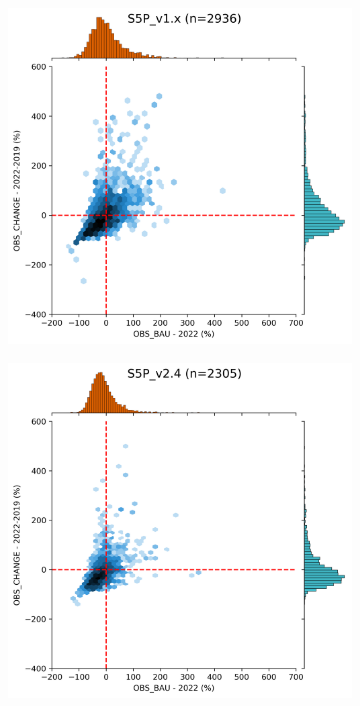 \begin{figure}[p]
    \centering
    \begin{subfigure}{.5\textwidth}
      \centering
      \includegraphics[width=\textwidth]{figs/chap3/fig7_a.png}
      \caption{}
      \label{fig:fig7a}
    \end{subfigure}%
    \begin{subfigure}{.5\textwidth}
      \centering
      \includegraphics[width=\textwidth]{figs/chap3/fig7_b.png}

\end{subfigure}
\end{figure}
